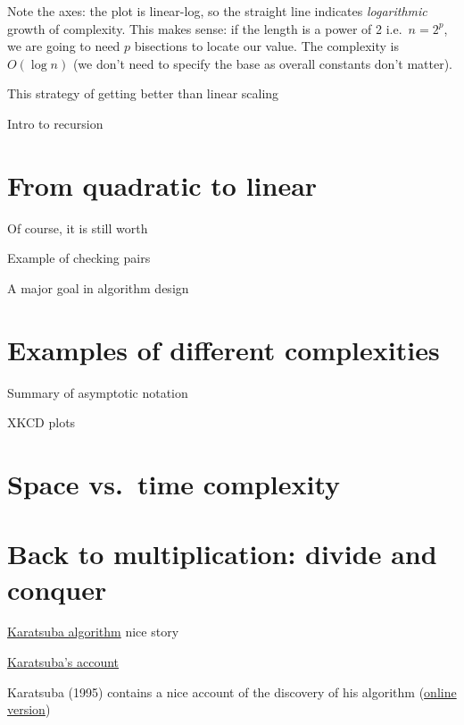 \documentclass[
  letterpaper,
  DIV=11,
  numbers=noendperiod]{scrreprt}
\theoremstyle{definition}
\theoremstyle{remark}
\begin{document}
Note the axes: the plot is linear-log, so the straight line indicates
\emph{logarithmic} growth of complexity. This makes sense: if the length
is a power of 2 i.e.~\(n=2^p\), we are going to need \(p\) bisections to
locate our value. The complexity is \(O(\log n)\) (we don't need to
specify the base as overall constants don't matter).

This strategy of getting better than linear scaling

Intro to recursion

\hypertarget{from-quadratic-to-linear}{%
\section{From quadratic to linear}\label{from-quadratic-to-linear}}

Of course, it is still worth

Example of checking pairs

A major goal in algorithm design

\hypertarget{examples-of-different-complexities}{%
\section{Examples of different
complexities}\label{examples-of-different-complexities}}

Summary of asymptotic notation

XKCD plots

\hypertarget{space-vs.-time-complexity}{%
\section{Space vs.~time complexity}\label{space-vs.-time-complexity}}

\hypertarget{back-to-multiplication-divide-and-conquer}{%
\section{Back to multiplication: divide and
conquer}\label{back-to-multiplication-divide-and-conquer}}

\href{https://en.wikipedia.org/wiki/Karatsuba_algorithm}{Karatsuba
algorithm} nice story

\href{http://www.cs.ru/personal/karatsuba/divcen.pdf}{Karatsuba's
account}

Karatsuba (1995) contains a nice account of the discovery of his
algorithm (\href{http://www.cs.ru/personal/karatsuba/divcen.pdf}{online
version})
\end{document}
